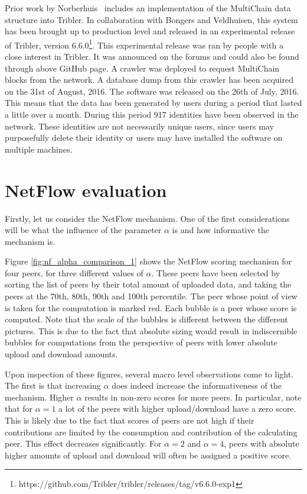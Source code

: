\documentclass[a4paper,11pt]{book}
\theoremstyle{definition}
\begin{document}
Prior work by Norberhuis~\cite{norberhuis2015multichain} includes
an implementation of the MultiChain data structure into Tribler. In collaboration with Bongers and Veldhuisen,
this system has been brought up to production level and released in an experimental release of Tribler,
version 6.6.0\footnote{https://github.com/Tribler/tribler/releases/tag/v6.6.0-exp1}. This experimental
release was ran by people with a close interest in Tribler. It was announced on the forums and could
also be found through above GitHub page. A crawler was deployed to request MultiChain blocks from 
the network. A database dump from this crawler has been acquired on the 31st of August, 2016. The software
was released on the 26th of July, 2016. This means that the data has been generated by users during a period
that lasted a little over a month. During this period 917 identities have been observed in the network.
These identities are not necessarily unique users, since users may purposefully 
delete their identity or users may have installed the software on multiple machines.

\section{NetFlow evaluation}

Firstly, let us consider the NetFlow mechanism. One of the first considerations will be what the influence
of the parameter $\alpha$ is and how informative the mechanism is.

Figure \ref{fig:nf_alpha_comparison_1} 
shows the NetFlow scoring mechanism for four peers, for three
different values of $\alpha$. 
These peers have been selected by sorting the list of peers by their total
amount of uploaded data, and taking the peers at the 70th, 80th, 90th and 100th percentile.
The peer whose point of view is taken for the computation is marked red. Each bubble is a peer whose
score is computed. Note that the scale of the bubbles is different between the different pictures. 
This is due to the fact that absolute sizing would result in indiscernible bubbles for computations
from the perspective of peers with lower absolute upload and download amounts. 

Upon inspection of these figures, several macro level observations come to light. The first
is that increasing $\alpha$ does indeed increase the informativeness of the mechanism.
Higher $\alpha$ results in non-zero scores for more peers. In particular, note that
for $\alpha=1$ a lot of the peers with higher upload/download have a zero score. This is
likely due to the fact that scores of peers are not high if their contributions are limited
by the consumption and contribution of the calculating peer. This effect decreases
significantly. For $\alpha=2$ and $\alpha=4$, peers with absolute higher amounts of upload
and download will often be assigned a positive score. 
\end{document}
